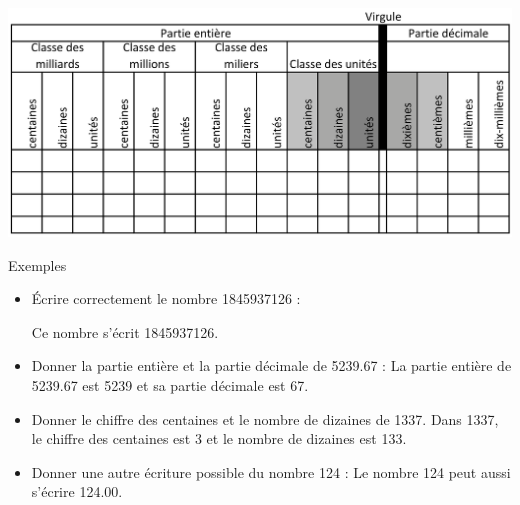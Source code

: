 \documentclass[xcolor={dvipsnames}]{beamer}
\begin{document}
\begin{frame}
	
	\begin{center}
		\includegraphics[scale=.18]{tab_rangs}\pause
	\end{center}

	\begin{exampleblock}{Exemples}
		\begin{itemize}
			\item \'Ecrire correctement le nombre 1845937126 : \pause
			
			Ce nombre s'écrit \num{1845937126}. \pause
			
			\item Donner la partie entière et la partie décimale de  \num{5239.67} :\pause
			La partie entière de \num{5239.67}  est \num{5239} et sa partie décimale est 67. \pause
			
			\item  Donner le chiffre des centaines et le nombre de dizaines de \num{1337}.\pause
			Dans \num{1337}, le chiffre des centaines est 3 et le nombre de dizaines est 133. \pause
				
			
			\item Donner une autre écriture possible du nombre 124 : \pause
			Le nombre \num{124} peut aussi s'écrire \num{124.00}.\pause
			
		\end{itemize}
	\end{exampleblock}
\end{frame}
\end{document}
